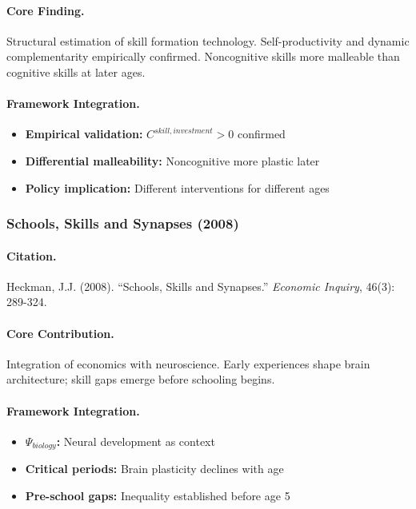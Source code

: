 \paragraph{Core Finding.}
Structural estimation of skill formation technology. Self-productivity
and dynamic complementarity empirically confirmed. Noncognitive skills
more malleable than cognitive skills at later ages.

\paragraph{Framework Integration.}
\begin{itemize}
  \item \textbf{Empirical validation:} $C^{skill,investment} > 0$ confirmed
  \item \textbf{Differential malleability:} Noncognitive more plastic later
  \item \textbf{Policy implication:} Different interventions for different ages
\end{itemize}

\subsubsection{Schools, Skills and Synapses (2008)}

\paragraph{Citation.}
Heckman, J.J. (2008). ``Schools, Skills and Synapses.''
\emph{Economic Inquiry}, 46(3): 289-324.

\paragraph{Core Contribution.}
Integration of economics with neuroscience. Early experiences shape
brain architecture; skill gaps emerge before schooling begins.

\paragraph{Framework Integration.}
\begin{itemize}
  \item \textbf{$\Psi_{biology}$:} Neural development as context
  \item \textbf{Critical periods:} Brain plasticity declines with age
  \item \textbf{Pre-school gaps:} Inequality established before age 5
\end{itemize}

